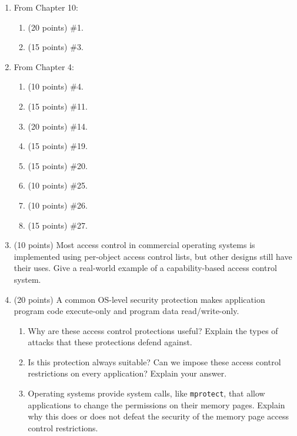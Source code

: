 \documentclass[letterpaper]{article}
\begin{document}
\begin{enumerate}

\item From Chapter 10:
\begin{enumerate}
\item (20 points) \#1.
\item (15 points) \#3.
\end{enumerate}

\item From Chapter 4:
\begin{enumerate}
\item (10 points) \#4.
\item (15 points) \#11.
\item (20 points) \#14.
\item (15 points) \#19.
\item (15 points) \#20.
\item (10 points) \#25.
\item (10 points) \#26.
\item (15 points) \#27.
\end{enumerate}

\item (10 points) Most access control in commercial operating systems is implemented using per-object access control lists, but other designs still have their uses. Give a real-world example of a capability-based access control system.

\item (20 points) A common OS-level security protection makes application program code execute-only and program data read/write-only.
\begin{enumerate}
\item Why are these access control protections useful? Explain the types of attacks that these protections defend against.
\item Is this protection always suitable? Can we impose these access control restrictions on every application? Explain your answer.
\item Operating systems provide system calls, like {\tt mprotect}, that allow applications to change the permissions on their memory pages. Explain why this does or does not defeat the security of the memory page access control restrictions.
\end{enumerate}


\end{enumerate}
\end{document}
